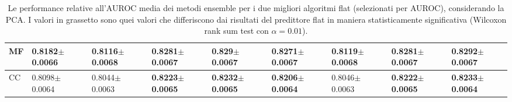 \documentclass[12pt]{report}
\begin{document}
\begin{appendices}
\begin{table}[h!]
{\begin{subtable}[t]{0.4\textwidth}
\begin{tabular}{|l|l|l|l|l|l|l|l|l|}
MF&\footnotesize{0.8182$\pm$0.0066}&\footnotesize{0.8116$\pm$0.0068}& \textbf{\footnotesize{0.8281$\pm$0.0067}} & \textbf{\footnotesize{0.829$\pm$0.0067}} & \textbf{\footnotesize{0.8271$\pm$0.0067}} &\footnotesize{0.8119$\pm$0.0068}& \textbf{\footnotesize{0.8281$\pm$0.0067}} & \textbf{\footnotesize{0.8292$\pm$0.0067}} \\ \hline
CC&\footnotesize{0.8098$\pm$0.0064}&\footnotesize{0.8044$\pm$0.0063}& \textbf{\footnotesize{0.8223$\pm$0.0065}} & \textbf{\footnotesize{0.8232$\pm$0.0065}} & \textbf{\footnotesize{0.8206$\pm$0.0064}} &\footnotesize{0.8046$\pm$0.0063}& \textbf{\footnotesize{0.8222$\pm$0.0065}} & \textbf{\footnotesize{0.8233$\pm$0.0064}} \\ \hline\end{tabular}
                    \label{table1}
                    \end{subtable}}
\caption{\footnotesize{Le performance relative all'AUROC media dei metodi ensemble per i due migliori algoritmi flat (selezionati per AUROC), considerando la PCA. I valori in grassetto sono quei valori che differiscono dai risultati del predittore flat in maniera statisticamente significativa (Wilcoxon rank sum test con $\alpha = 0.01$).}}
\label{best_auroc_pca}
\end{table}


\end{appendices}
\end{document}
